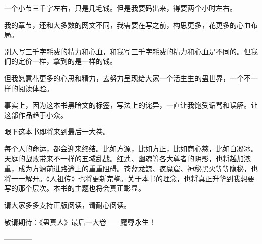 \begin{this_body}
一个小节三千字左右，只是几毛钱。但是我要码出来，得要两个小时左右。

我的章节，还和大多数的网文不同，我需要在写之前，构思更多，花更多的心血布局。

别人写三千字耗费的精力和心血，和我写三千字耗费的精力和心血是不同的。但我们的定价一样，拿到的是一样的钱。

但我愿意花更多的心思和精力，去努力呈现给大家一个活生生的蛊世界，一个不一样的阅读体验。

事实上，因为这本书黑暗文的标签，写法上的诧异，一直让我饱受诟骂和误解。让这部作品趋于小众。

眼下这本书即将来到最后一大卷。

每个人的命运，都会迎来终结。比如方源，比如方正，比如商心慈，比如白凝冰。天庭的战败带来不一样的五域乱战。红莲、幽魂等各大尊者的阴影，也将越加浓重，成为方源前进路途上的重重阻碍。苍蓝龙鲸、疯魔窟、神秘黑火等等隐秘，也将一一解开。《人祖传》也将更新完整。关于本书的理念，也将真正升华到我想要写的那个层次。本书的主题也将会真正彰显。

请大家多多支持正版阅读，请耐心阅读。

敬请期待：《蛊真人》最后一大卷——魔尊永生！

------------

\end{this_body}

